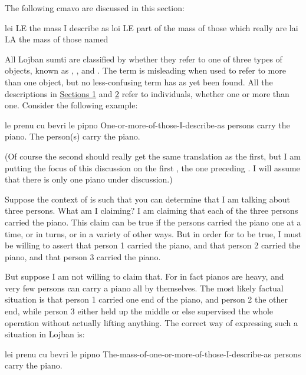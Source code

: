The following cmavo are discussed in this section:

   lei LE  the mass I describe as
    loi LE  part of the mass of those which really are
    lai LA  the mass of those named

All Lojban sumti are classified by whether they refer to one of
    three types of objects, known as , ,
    and . The term  is misleading when used
    to refer to more than one object, but no less-confusing term
    has as yet been found. All the descriptions in \hyperref[sec:6:1]{Sections 1} and \hyperref[sec:6:2]{2} refer to
    individuals, whether one or more than one. Consider the
    following example:
\begin{example}
le prenu cu bevri le pipno\n
One-or-more-of-those-I-describe-as persons\n
\T	carry the piano.\n
The person(s) carry the piano.
\end{example}

(Of course the second  should really get the same
    translation as the first, but I am putting the focus of this
    discussion on the first , the one preceding . I
    will assume that there is only one piano under discussion.) 

Suppose the context of  is
    such that you can determine that I am talking about three
    persons. What am I claiming? I am claiming that each of the
    three persons carried the piano. This claim can be true if the
    persons carried the piano one at a time, or in turns, or in a
    variety of other ways. But in order for  to be true, I must be willing to assert that person 1
    carried the piano, and that person 2 carried the piano, and
    that person 3 carried the piano.

But suppose I am not willing to claim that. For in fact
    pianos are heavy, and very few persons can carry a piano all by
    themselves. The most likely factual situation is that person 1
    carried one end of the piano, and person 2 the other end, while
    person 3 either held up the middle or else supervised the whole
    operation without actually lifting anything. The correct way of
    expressing such a situation in Lojban is:
\begin{example}
lei prenu cu bevri le pipno\n
The-mass-of-one-or-more-of-those-I-describe-as persons\n
\T	carry the piano.
\end{example}

